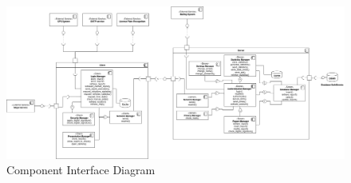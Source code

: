 \documentclass{article}
\begin{document}
\begin{figure}[H]
    \centering
    \includegraphics[width=1.2\textwidth, left]{img/component_interface_diagrams/component_interface.png}
    \caption{Component Interface Diagram}
\end{figure}

\clearpage
\end{document}
